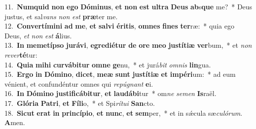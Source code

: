 {11.~}\textbf{Num}\textbf{quid} \textbf{non} \textbf{e}\textbf{go} \textbf{Dó}\textbf{mi}\textbf{nus}, \textbf{et} \textbf{non} \textbf{est} \textbf{ul}\textbf{tra} \textbf{De}\textbf{us} \textbf{ab}s\textbf{que} me?~* Deus justus, et sal\textit{vans} \textit{non} \textit{est} \textbf{præ}ter me.\\
{12.~}\textbf{Con}\textbf{ver}\textbf{tí}\textbf{mi}\textbf{ni} \textbf{ad} \textbf{me}, \textbf{et} \textbf{sal}\textbf{vi} \textbf{é}\textbf{ri}\textbf{tis}, \textbf{om}\textbf{nes} \textbf{fi}\textbf{nes} \textbf{ter}ræ:~* quia ego Deus, \textit{et} \textit{non} \textit{est} \textbf{á}lius.\\
{13.~}\textbf{In} \textbf{me}\textbf{me}\textbf{tí}\textbf{pso} \textbf{ju}\textbf{rá}\textbf{vi}, \textbf{e}\textbf{gre}\textbf{di}\textbf{é}\textbf{tur} \textbf{de} \textbf{o}\textbf{re} \textbf{me}\textbf{o} \textbf{ju}\textbf{stí}\textbf{ti}\textbf{æ} \textbf{ver}bum,~* et \textit{non} \textit{re}\textit{ver}\textbf{té}tur:\\
{14.~}\textbf{Qui}\textbf{a} \textbf{mi}\textbf{hi} \textbf{cur}\textbf{vá}\textbf{bi}\textbf{tur} \textbf{om}\textbf{ne} \textbf{ge}nu,~* et jurá\textit{bit} \textit{om}\textit{nis} \textbf{lin}gua.\\
{15.~}\textbf{Er}\textbf{go} \textbf{in} \textbf{Dó}\textbf{mi}\textbf{no}, \textbf{di}\textbf{cet}, \textbf{me}\textbf{æ} \textbf{sunt} \textbf{ju}\textbf{stí}\textbf{ti}\textbf{æ} \textbf{et} \textbf{im}\textbf{pé}\textbf{ri}um:~* ad eum vénient, et confundéntur omnes qui \textit{re}\textit{pú}\textit{gnant} \textbf{e}i.\\
{16.~}\textbf{In} \textbf{Dó}\textbf{mi}\textbf{no} \textbf{ju}\textbf{sti}\textbf{fi}\textbf{cá}\textbf{bi}\textbf{tur}, \textbf{et} \textbf{lau}\textbf{dá}\textbf{bi}tur~* om\textit{ne} \textit{se}\textit{men} \textbf{Is}raël.\\
{17.~}\textbf{Gló}\textbf{ri}\textbf{a} \textbf{Pa}\textbf{tri}, \textbf{et} \textbf{Fí}\textbf{li}o,~* et Spi\textit{rí}\textit{tu}\textit{i} \textbf{San}cto.\\
{18.~}\textbf{Si}\textbf{cut} \textbf{e}\textbf{rat} \textbf{in} \textbf{prin}\textbf{cí}\textbf{pi}\textbf{o}, \textbf{et} \textbf{nunc}, \textbf{et} \textbf{sem}per,~* et in sǽcula sæ\textit{cu}\textit{ló}\textit{rum}. \textbf{A}men.\\
